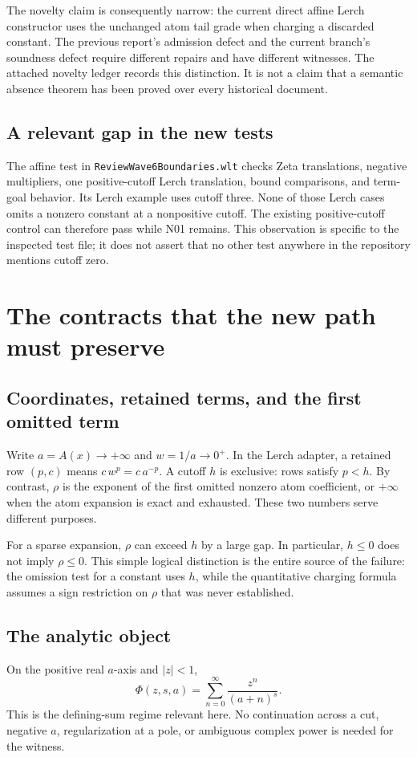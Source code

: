 \documentclass[11pt,letterpaper]{article}
\newcommand{\code}[1]{\nolinkurl{#1}}
\begin{document}
The novelty claim is consequently narrow: the current direct affine Lerch
constructor uses the unchanged atom tail grade when charging a discarded
constant. The previous report's admission defect and the current branch's
soundness defect require different repairs and have different witnesses.
The attached novelty ledger records this distinction. It is not a claim that
a semantic absence theorem has been proved over every historical document.

\subsection{A relevant gap in the new tests}
The affine test in \code{ReviewWave6Boundaries.wlt} checks Zeta translations,
negative multipliers, one positive-cutoff Lerch translation, bound comparisons,
and term-goal behavior. Its Lerch example uses cutoff three. None of those
Lerch cases omits a nonzero constant at a nonpositive cutoff.
The existing positive-cutoff control can therefore pass while N01 remains.
This observation is specific to the inspected test file; it does not assert
that no other test anywhere in the repository mentions cutoff zero.
\cite{boundarytests}

\section{The contracts that the new path must preserve}
\subsection{Coordinates, retained terms, and the first omitted term}
Write $a=A(x)\to+\infty$ and $w=1/a\to0^+$. In the Lerch adapter, a retained
row $(p,c)$ means $c\,w^p=c\,a^{-p}$. A cutoff $h$ is exclusive: rows satisfy
$p<h$. By contrast, $\rho$ is the exponent of the first omitted nonzero atom
coefficient, or $+\infty$ when the atom expansion is exact and exhausted.
These two numbers serve different purposes.\cite{dirichlet}

For a sparse expansion, $\rho$ can exceed $h$ by a large gap. In particular,
$h\le0$ does not imply $\rho\le0$. This simple logical distinction is the
entire source of the failure: the omission test for a constant uses $h$, while
the quantitative charging formula assumes a sign restriction on $\rho$ that
was never established.

\subsection{The analytic object}
On the positive real $a$-axis and $|z|<1$,
\begin{equation}\label{eq:def}
 \Phi(z,s,a)=\sum_{n=0}^{\infty}\frac{z^n}{(a+n)^s}.
\end{equation}
This is the defining-sum regime relevant here. No continuation across a cut,
negative $a$, regularization at a pole, or ambiguous complex power is needed
for the witness.\cite{dlmf,lerchdoc}
\end{document}
